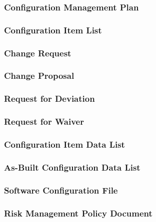 \subsubsection{Configuration Management Plan}
\label{app:Configuration Management Plan}

\subsubsection{Configuration Item List}
\label{app:Configuration Item List}

\subsubsection{Change Request}
\label{app:Change Request}

\subsubsection{Change Proposal}
\label{app:Change Proposal}

\subsubsection{Request for Deviation}
\label{app:Request for Deviation}

\subsubsection{Request for Waiver}
\label{app:Request for Waiver}

\subsubsection{Configuration Item Data List}
\label{app:Configuration Item Data List}

\subsubsection{As-Built Configuration Data List}
\label{app:As-Built Configuration Data List}

\subsubsection{Software Configuration File}
\label{app:Software Configuration File}

\subsubsection{Risk Management Policy Document}
\label{app:Risk Management Policy Document}

